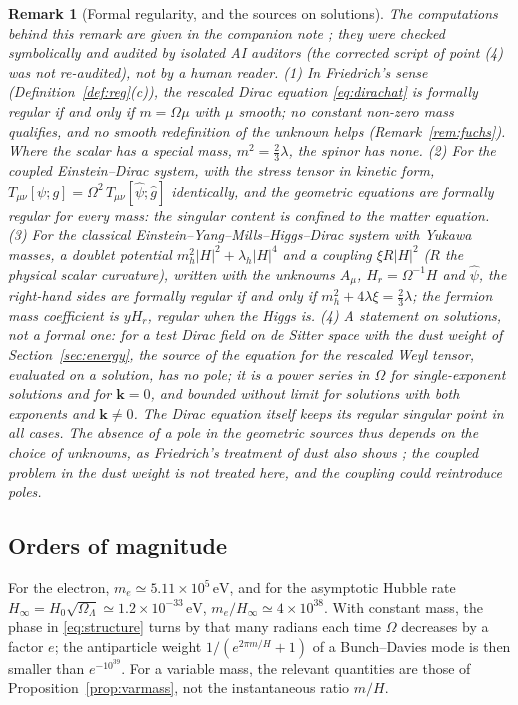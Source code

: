 \documentclass[11pt,a4paper]{article}
\newtheorem{remark}{Remark}
\theoremstyle{definition}
\newcommand{\hg}{\hat g}
\newcommand{\hpsi}{\hat\psi}
\begin{document}
\begin{remark}[Formal regularity, and the sources on solutions]
\label{rem:friedrich}
The computations behind this remark are given in the companion note \cite{Companion}; they were checked symbolically and audited by isolated AI auditors (the corrected script of point (4) was not re-audited), not by a human reader. (1) In Friedrich's sense (Definition~\ref{def:reg}(c)), the rescaled Dirac equation \eqref{eq:dirachat} is formally regular if and only if $m=\Omega\mu$ with $\mu$ smooth; no constant non-zero mass qualifies, and no smooth redefinition of the unknown helps (Remark~\ref{rem:fuchs}). Where the scalar has a special mass, $m^{2}=\tfrac23\lambda$, the spinor has none. (2) For the coupled Einstein--Dirac system, with the stress tensor in kinetic form, $T_{\mu\nu}[\psi;g]=\Omega^{2}\,T_{\mu\nu}[\hpsi;\hg]$ identically, and the geometric equations are formally regular for every mass: the singular content is confined to the matter equation. (3) For the classical Einstein--Yang--Mills--Higgs--Dirac system with Yukawa masses, a doublet potential $m_{h}^{2}|H|^{2}+\lambda_{h}|H|^{4}$ and a coupling $\xi R|H|^{2}$ ($R$ the physical scalar curvature), written with the unknowns $A_{\mu}$, $H_{r}=\Omega^{-1}H$ and $\hpsi$, the right-hand sides are formally regular if and only if $m_{h}^{2}+4\lambda\xi=\tfrac23\lambda$; the fermion mass coefficient is $y H_{r}$, regular when the Higgs is. (4) A statement on solutions, not a formal one: for a test Dirac field on de Sitter space with the dust weight of Section~\ref{sec:energy}, the source of the equation for the rescaled Weyl tensor, evaluated on a solution, has no pole; it is a power series in $\Omega$ for single-exponent solutions and for $\mathbf{k}=0$, and bounded without limit for solutions with both exponents and $\mathbf{k}\neq0$. The Dirac equation itself keeps its regular singular point in all cases. The absence of a pole in the geometric sources thus depends on the choice of unknowns, as Friedrich's treatment of dust also shows \cite{Friedrich2017}; the coupled problem in the dust weight is not treated here, and the coupling could reintroduce poles.
\end{remark}

\subsection{Orders of magnitude}

For the electron, $m_{e}\simeq5.11\times10^{5}\,\mathrm{eV}$, and for the asymptotic Hubble rate $H_{\infty}=H_{0}\sqrt{\Omega_{\Lambda}}\simeq1.2\times10^{-33}\,\mathrm{eV}$, $m_{e}/H_{\infty}\simeq4\times10^{38}$. With constant mass, the phase in \eqref{eq:structure} turns by that many radians each time $\Omega$ decreases by a factor $e$; the antiparticle weight $1/(e^{2\pi m/H}+1)$ of a Bunch--Davies mode is then smaller than $e^{-10^{39}}$. For a variable mass, the relevant quantities are those of Proposition~\ref{prop:varmass}, not the instantaneous ratio $m/H$.
\end{document}
